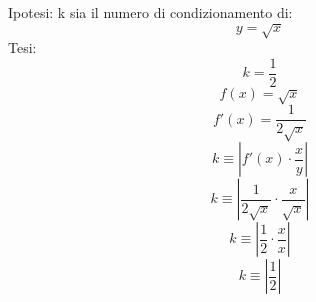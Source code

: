 Ipotesi: k sia il numero di condizionamento di:
\[
y = \sqrt{x} 
\]
Tesi:
\[
k=\frac{1}{2}
\]
\[
f(x) = \sqrt{x}
\]
\[
f'(x) = \frac{1}{2\sqrt{x}}
\]
\[
k \equiv |f'(x) \cdot \frac{x}{y} |
\]
\[
k \equiv | \frac{1}{2\sqrt{x}} \cdot \frac{x}{ \sqrt{x} } |
\]
\[
k \equiv | \frac{1}{2} \cdot \frac{x}{x} |
\]
\[
k \equiv | \frac{1}{2}|
\]